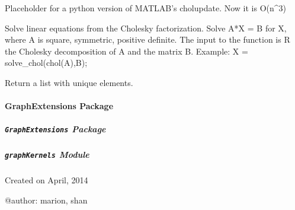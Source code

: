 \documentclass[letterpaper,10pt,english]{sphinxmanual}
\begin{document}

\begin{fulllineitems}
\label{pyGPs.Core:pyGPs.Core.tools.cholupdate}
Placeholder for a python version of MATLAB's cholupdate.  Now it is O(n\textasciicircum{}3)

\end{fulllineitems}


\begin{fulllineitems}
\label{pyGPs.Core:pyGPs.Core.tools.solve_chol}
Solve linear equations from the Cholesky factorization.
Solve A*X = B for X, where A is square, symmetric, positive definite. The
input to the function is R the Cholesky decomposition of A and the matrix B.
Example: X = solve\_chol(chol(A),B);

\end{fulllineitems}


\begin{fulllineitems}
\label{pyGPs.Core:pyGPs.Core.tools.unique}
Return a list with unique elements.

\end{fulllineitems}



\paragraph{GraphExtensions Package}
\label{pyGPs.GraphExtensions:graphextensions-package}\label{pyGPs.GraphExtensions::doc}

\subparagraph{\texttt{GraphExtensions} Package}
\label{pyGPs.GraphExtensions:id1}\label{pyGPs.GraphExtensions:module-pyGPs.GraphExtensions}

\subparagraph{\texttt{graphKernels} Module}
\label{pyGPs.GraphExtensions:graphkernels-module}\label{pyGPs.GraphExtensions:module-pyGPs.GraphExtensions.graphKernels}
Created on April, 2014

@author: marion, shan
\end{document}
